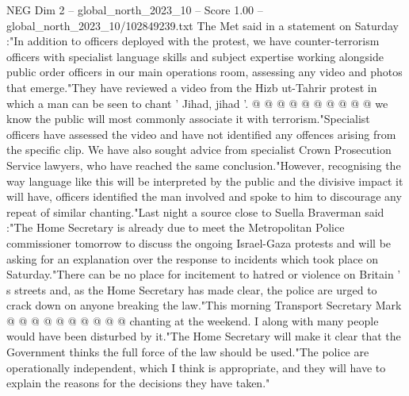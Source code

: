 \begin{textsample}{NEG Dim 2 – global\_north\_2023\_10 – Score 1.00 – global\_north\_2023\_10/102849239.txt}
The Met said in a statement on Saturday :"In addition to officers deployed with the protest, we have counter-terrorism officers with specialist language skills and subject expertise working alongside public order officers in our main operations room, assessing any video and photos that emerge."They have reviewed a video from the Hizb ut-Tahrir protest in which a man can be seen to chant ' Jihad, jihad '. @ @ @ @ @ @ @ @ @ @ we know the public will most commonly associate it with terrorism."Specialist officers have assessed the video and have not identified any offences arising from the specific clip.
We have also sought advice from specialist Crown Prosecution Service lawyers, who have reached the same conclusion."However, recognising the way language like this will be interpreted by the public and the divisive impact it will have, officers identified the man involved and spoke to him to discourage any repeat of similar chanting."Last night a source close to Suella Braverman said :"The Home Secretary is already due to meet the Metropolitan Police commissioner tomorrow to discuss the ongoing Israel-Gaza protests and will be asking for an explanation over the response to incidents which took place on Saturday."There can be no place for incitement to hatred or violence on Britain ' s streets and, as the Home Secretary has made clear, the police are urged to crack down on anyone breaking the law."This morning Transport Secretary Mark @ @ @ @ @ @ @ @ @ @ chanting at the weekend.
I along with many people would have been disturbed by it."The Home Secretary will make it clear that the Government thinks the full force of the law should be used."The police are operationally independent, which I think is appropriate, and they will have to explain the reasons for the decisions they have taken."

\end{textsample}
